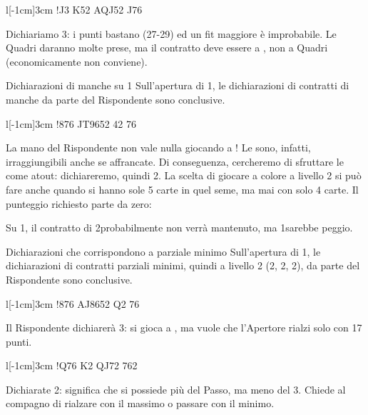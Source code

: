 \documentclass[../corsofiori.tex]{subfiles}
\begin{document}
\begin{wraptable}[4]{l}[-1cm]{3cm}
\hand!{J3} {K52} {AQJ52} {J76}
\end{wraptable}

Dichiariamo 3\SA: i punti bastano
(27-29) ed un fit maggiore è
improbabile. Le Quadri daranno molte
prese, ma il contratto deve essere a
\SA, non a Quadri (economicamente non conviene).

\begin{regola}{Dichiarazioni di manche su 1\SA}
    Sull'apertura di 1\SA, le dichiarazioni di contratti di manche da parte del Rispondente sono conclusive.
\end{regola}

\begin{wraptable}[5]{l}[-1cm]{3cm}
\hand!{876} {JT9652} {42} {76}
\end{wraptable}

La mano del Rispondente non vale nulla giocando a \SA! Le \cu sono, infatti, irraggiungibili anche se affrancate. Di
conseguenza, cercheremo di sfruttare le \cu come atout: dichiareremo, quindi 2\He. La scelta di giocare a colore
a livello 2 si può fare anche quando si hanno sole 5 carte in quel seme, ma mai con solo 4 carte. Il punteggio richiesto
parte da zero:


Su 1\SA, il contratto di 2\He probabilmente non verrà mantenuto, ma 1\SA sarebbe peggio.


\begin{regola}{Dichiarazioni che corrispondono a parziale minimo}
    Sull'apertura di 1\SA, le dichiarazioni di contratti parziali minimi, quindi a livello 2 (2\Di, 2\He, 2\Sp), da parte del Rispondente sono conclusive.
\end{regola}

\begin{wraptable}[2]{l}[-1cm]{3cm}
\hand!{876} {AJ8652} {Q2} {76}
\end{wraptable}

Il Rispondente dichiarerà 3\BH: si gioca a \cu, ma vuole che l'Apertore rialzi solo con 17 punti.


\vspace{1cm}

\begin{wraptable}[3]{l}[-1cm]{3cm}
\hand!{Q76} {K2} {QJ72} {762}
\end{wraptable}


Dichiarate 2\SA: significa che si possiede più del Passo, ma meno del 3\SA. Chiede al compagno di rialzare con il
massimo o passare con il minimo.
\end{document}
